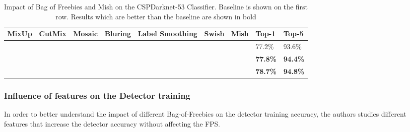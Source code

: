 \begin{table}[h!]
	\centering
	\begin{tabular}{@{}lllllllll@{}}
		\toprule
		MixUp & CutMix     & Mosaic     & Bluring & Label Smoothing & Swish & Mish & Top-1  & Top-5  \\ \midrule
		&            &            &         &                 &       &      & 77.2\% & 93.6\% \\ \midrule
		& \checkmark & \checkmark &         & \checkmark      &       &      & \textbf{77.8\%} & \textbf{94.4\%} \\
		  & \checkmark & \checkmark &         & \checkmark      &       &      & \textbf{78.7\%} & \textbf{94.8\%} \\ \bottomrule
	\end{tabular}
		  \caption{Impact of Bag of Freebies and Mish on the CSPDarknet-53 Classifier. Baseline is shown on the first row. Results which are better than the baseline are shown in bold}
		  \label{tab:CSPDarknet53}
\end{table}

\subsubsection{Influence of features on the Detector training}
In order to better understand the impact of different Bag-of-Freebies on the detector training accuracy, the authors studies different features that increase the detector accuracy without affecting the FPS.

